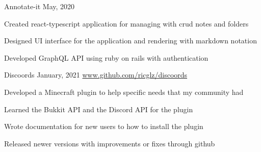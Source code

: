\begin{cventries}
  \cventry
    {}
    {Annotate-it}
    {May, 2020}
    {}
    {
      \begin{cvitems}
        \item {Created react-typescript application for managing with crud notes and folders}
        \item {Designed UI interface for the application and rendering with markdown notation}
        \item {Developed GraphQL API using ruby on rails with authentication}
      \end{cvitems}
    }
  \cventry
    {}
    {Discoords}
    {January, 2021}
    {\url{www.github.com/ricglz/discoords}}
    {
      \begin{cvitems}
        \item {Developed a Minecraft plugin to help specific needs that my community had}
        \item {Learned the Bukkit API and the Discord API for the plugin}
        \item {Wrote documentation for new users to how to install the plugin}
        \item {Released newer versions with improvements or fixes through github}
      \end{cvitems}
    }
\end{cventries}
